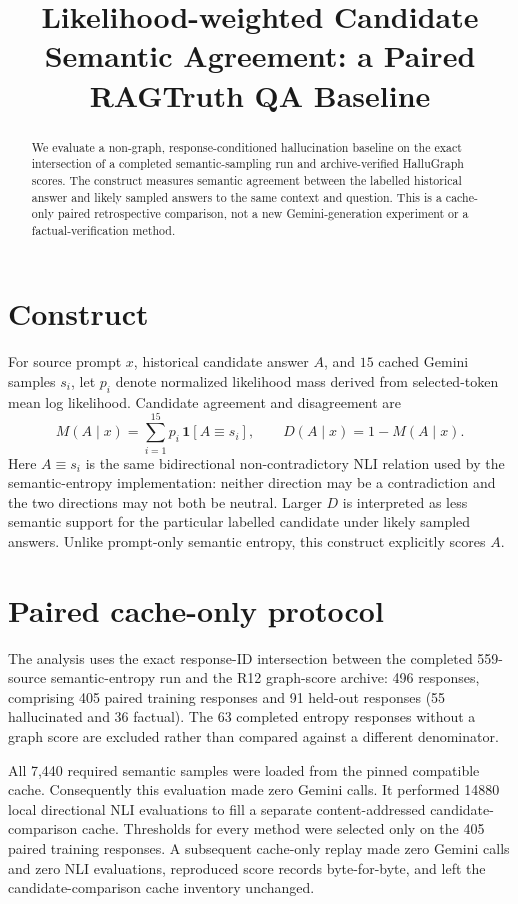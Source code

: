 \documentclass[11pt,a4paper]{article}
\title{\vspace{-1.2em}\textbf{Likelihood-weighted Candidate Semantic Agreement: a Paired RAGTruth QA Baseline}}
\author{}
\date{}
\begin{document}
\maketitle
\vspace{-1.7em}
\begin{abstract}
We evaluate a non-graph, response-conditioned hallucination baseline on the exact intersection of a completed semantic-sampling run and archive-verified HalluGraph scores.  The construct measures semantic agreement between the labelled historical answer and likely sampled answers to the same context and question.  This is a cache-only paired retrospective comparison, not a new Gemini-generation experiment or a factual-verification method.
\end{abstract}

\section{Construct}
For source prompt $x$, historical candidate answer $A$, and $15$ cached Gemini samples $s_i$, let $p_i$ denote normalized likelihood mass derived from selected-token mean log likelihood.  Candidate agreement and disagreement are
\begin{equation}
 M(A\mid x)=\sum_{i=1}^{15}p_i\,\mathbf{1}[A\equiv s_i],\qquad D(A\mid x)=1-M(A\mid x).
\end{equation}
Here $A\equiv s_i$ is the same bidirectional non-contradictory NLI relation used by the semantic-entropy implementation: neither direction may be a contradiction and the two directions may not both be neutral.  Larger $D$ is interpreted as less semantic support for the particular labelled candidate under likely sampled answers.  Unlike prompt-only semantic entropy, this construct explicitly scores $A$.

\section{Paired cache-only protocol}
The analysis uses the exact response-ID intersection between the completed 559-source semantic-entropy run and the R12 graph-score archive: 496 responses, comprising 405 paired training responses and 91 held-out responses (55 hallucinated and 36 factual).  The 63 completed entropy responses without a graph score are excluded rather than compared against a different denominator.

All 7,440 required semantic samples were loaded from the pinned compatible cache.  Consequently this evaluation made zero Gemini calls.  It performed 14880 local directional NLI evaluations to fill a separate content-addressed candidate-comparison cache.  Thresholds for every method were selected only on the 405 paired training responses.  A subsequent cache-only replay made zero Gemini calls and zero NLI evaluations, reproduced score records byte-for-byte, and left the candidate-comparison cache inventory unchanged.
\end{document}
